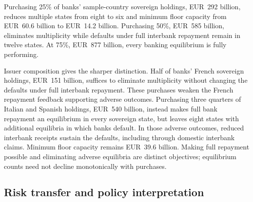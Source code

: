 \begin{table}[htbp]
\centering
{}
\label{tab:eurosystem-purchases}

\small
\renewcommand{\arraystretch}{1.12}


\end{table}

Purchasing 25\% of banks' sample-country sovereign holdings, EUR~292 billion, reduces multiple states from eight to six and minimum floor capacity from EUR~60.6 billion to EUR~14.2 billion. Purchasing 50\%, EUR~585 billion, eliminates multiplicity while defaults under full interbank repayment remain in twelve states. At 75\%, EUR~877 billion, every banking equilibrium is fully performing.

Issuer composition gives the sharper distinction. Half of banks' French sovereign holdings, EUR~151 billion, suffices to eliminate multiplicity without changing the defaults under full interbank repayment. These purchases weaken the French repayment feedback supporting adverse outcomes. Purchasing three quarters of Italian and Spanish holdings, EUR~540 billion, instead makes full bank repayment an equilibrium in every sovereign state, but leaves eight states with additional equilibria in which banks default. In those adverse outcomes, reduced interbank receipts sustain the defaults, including through domestic interbank claims. Minimum floor capacity remains EUR~39.6 billion. Making full repayment possible and eliminating adverse equilibria are distinct objectives; equilibrium counts need not decline monotonically with purchases.

\subsection{Risk transfer and policy interpretation}

